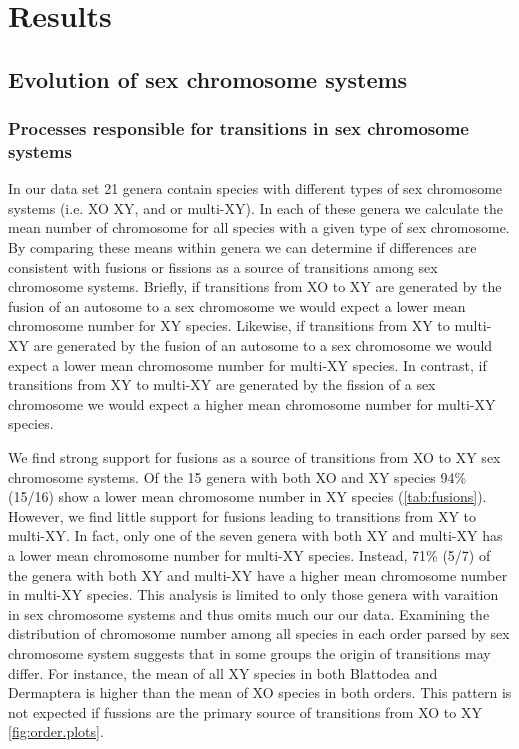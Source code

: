 \section{Results}

\subsection{Evolution of sex chromosome systems}
\subsubsection{Processes responsible for transitions in sex chromosome systems}
In our data set 21 genera contain species with different types of sex chromosome systems (i.e. XO XY, and or multi-XY).
In each of these genera we calculate the mean number of chromosome for all species with a given type of sex chromosome.
By comparing these means within genera we can determine if differences are consistent with fusions or fissions as a source of transitions among sex chromosome systems.
Briefly, if transitions from XO to XY are generated by the fusion of an autosome to a sex chromosome we would expect a lower mean chromosome number for XY species.
Likewise, if transitions from XY to multi-XY are generated by the fusion of an autosome to a sex chromosome we would expect a lower mean chromosome number for multi-XY species.
In contrast, if transitions from XY to multi-XY are generated by the fission of a sex chromosome we would expect a higher mean chromosome number for multi-XY species.

We find strong support for fusions as a source of transitions from XO to XY sex chromosome systems.
Of the 15 genera with both XO and XY species 94\% (15/16) show a lower mean chromosome number in XY species (\cref{tab:fusions}). 
However, we find little support for fusions leading to transitions from XY to multi-XY.
In fact, only one of the seven genera with both XY and multi-XY has a lower mean chromosome number for multi-XY species.
Instead, 71\% (5/7) of the genera with both XY and multi-XY have a higher mean chromosome number in multi-XY species.
This analysis is limited to only those genera with varaition in sex chromosome systems and thus omits much our our data.
Examining the distribution of chromosome number among all species in each order parsed by sex chromosome system suggests that in some groups the origin of transitions may differ.
For instance, the mean of all XY species in both Blattodea and Dermaptera is higher than the mean of XO species in both orders.
This pattern is not expected if fussions are the primary source of transitions from XO to XY \cref{fig:order.plots}.

